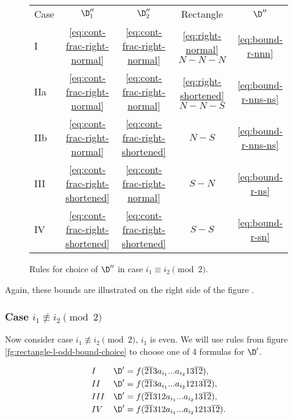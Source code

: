 \begin{figure}[ht]
	\centering
		\begin{tabular}{| l | c c c | c |}
			\cline{1-5}
				Case &
				$\D_1''$ &
				$\D_2''$ &
				Rectangle &
				$\D''$
			\\
			\cline{1-5}
				I &
				\ref{eq:cont-frac-right-normal} &
				\ref{eq:cont-frac-right-normal} &
				\ref{eq:right-normal} $N-N-N$ &
				\ref{eq:bound-r-nnn}
			\\
				IIa &
				\ref{eq:cont-frac-right-normal} &
				\ref{eq:cont-frac-right-normal} &
				\ref{eq:right-shortened} $N-N-S$ &
				\ref{eq:bound-r-nns-ns}
			\\
				IIb &
				\ref{eq:cont-frac-right-normal} &
				\ref{eq:cont-frac-right-shortened} &
				$N-S$ &
				\ref{eq:bound-r-nns-ns}
			\\
				III &
				\ref{eq:cont-frac-right-shortened} &
				\ref{eq:cont-frac-right-normal} &
				$S-N$ &
				\ref{eq:bound-r-ns}
			\\
				IV &
				\ref{eq:cont-frac-right-shortened} &
				\ref{eq:cont-frac-right-shortened} &
				$S-S$ &
				\ref{eq:bound-r-sn}
			\\
			\cline{1-5}
		\end{tabular}
	\caption{Rules for choice of $\D''$ in case $i_1 \equiv i_2 \pmod 2$.}
	\label{fg:rectangle-r-bound-choice}
\end{figure}

Again, these bounds are illustrated on the right side of the figure .

\subsubsection{Case $i_1 \not\equiv i_2 \pmod 2$}

Now consider case $i_1 \not\equiv i_2 \pmod 2$, $i_1$ is even.
We will use rules from figure \ref{fg:rectangle-l-odd-bound-choice} to choose one of 4 formulas for $\D'$.

\begin{subequations}
	\begin{align}
		\label{eq:bound-l-odd-nn}
		&&&&& I & \D' & = f(\overline{21}3a_{i_1}... a_{i_2}13\overline{12}), &&&& \\
		\label{eq:bound-l-odd-ns}
		&&&&& II & \D' & = f(\overline{21}3a_{i_1}... a_{i_2}1213\overline{12}), &&&& \\
		\label{eq:bound-l-odd-sn}
		&&&&& III & \D' & = f(\overline{21}312a_{i_1}... a_{i_2}13\overline{12}), &&&& \\
		\label{eq:bound-l-odd-ss}
		&&&&& IV & \D' & = f(\overline{21}312a_{i_1}... a_{i_2}1213\overline{12}). &&&&
	\end{align}
\end{subequations}

